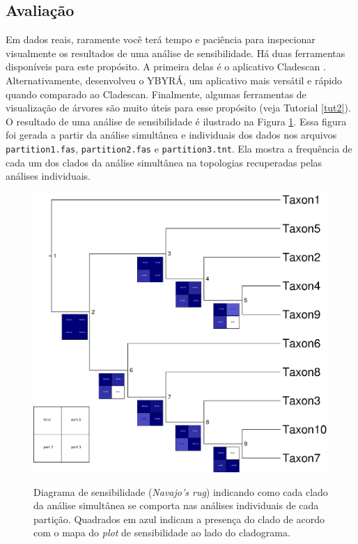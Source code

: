 \begin{refsection}
\subsection{Avaliação}\label{tut10:sa:evaluation}

Em dados reais, raramente você terá tempo e paciência para inspecionar visualmente os resultados de uma análise de sensibilidade. Há duas ferramentas disponíveis para este propósito. A primeira delas é o aplicativo Cladescan \parencite[][; disponível para baixar \href{https://rc.fas.harvard.edu/resources/documentation/software/cladescan/}{aqui}]{Sanders_2010}. Alternativamente, \textcite{Machado_2014} desenvolveu o YBYRÁ, um aplicativo mais versátil e rápido quando comparado ao Cladescan. Finalmente, algumas ferramentas de visualização de árvores \parencite[\textit{e.g.}, FigTree;][]{Rambaut_2006} são muito úteis para esse propósito (veja Tutorial \ref{tut2}). O resultado de uma análise de sensibilidade é ilustrado na Figura \ref{tut10:fig:sens_plot}. Essa figura foi gerada a partir da análise simultânea e individuais dos dados nos arquivos \texttt{partition1.fas}, \texttt{partition2.fas} e \texttt{partition3.tnt}. Ela mostra a frequência de cada um dos clados da análise simultânea na topologias recuperadas pelas análises individuais. 


  \begin{figure}[H]
       \centering
      {\includegraphics[scale=0.9]{figures/tut10/sens_plot.eps}}
	{\caption[Diagrama de sensibilidade (\textit{Navajo's rug})]{Diagrama de sensibilidade (\textit{Navajo's rug}) indicando como cada clado da análise simultânea se comporta nas análises individuais de cada partição. Quadrados em azul indicam a presença do clado de acordo com o mapa do \textit{plot} de sensibilidade ao lado do cladograma.}\label{tut10:fig:sens_plot}}
  \end{figure}


\end{refsection}
